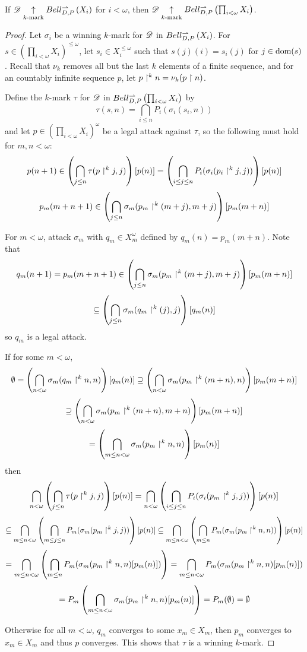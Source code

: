 \begin{thm}
  If $\mathscr{D}\underset{k\text{-mark}}{\uparrow} Bell_{D,P}^{\rightharpoonup}\left({X_i}\right)$ for $i<\omega$, then
  $\mathscr{D}\underset{k\text{-mark}}{\uparrow} Bell_{D,P}^{\rightharpoonup}\left({\prod_{i<\omega}X_i}\right)$.
\end{thm}

\begin{proof}
  Let $\sigma_i$ be a winning $k$-mark for $\mathscr{D}$ in $Bell_{D,P}^{\rightharpoonup}\left({X_i}\right)$.
  For $s\in \left(\prod_{i<\omega}X_i\right)^{\leq \omega}$,
  let $s_i \in X_i^{\leq \omega}$ such that $s(j)(i)=s_i(j)$ for $j\in\textrm{dom}(s)$.
  Recall that $\nu_k$ removes all but the last $k$ elements of a finite
  sequence, and for an countably infinite sequence $p$,
  let $p\restriction^k n=\nu_k(p\restriction n)$.

  Define the $k$-mark $\tau$ for $\mathscr{D}$ in $Bell_{D,P}^{\rightharpoonup}\left({\prod_{i<\omega}X_i}\right)$
  by
    \[
      \tau(s,n)
        =
      \bigcap_{i\leq n}
      P_i(\sigma_i(s_i,n))
    \]
  and let $p\in\left(\prod_{i<\omega}X_i\right)^\omega$ be a legal attack
  against $\tau$, so the following must hold for $m,n<\omega$:
    \[
      p(n+1)
        \in
      \left(\bigcap_{j\leq n}\tau(p\restriction^k j,j)\right)[p(n)]
        =
      \left(\bigcap_{i\leq j\leq n}P_i(\sigma_i(p_i\restriction^k j,j))\right)[p(n)]
    \]
    \[
      p_m(m+n+1)
        \in
      \left(\bigcap_{j\leq n}\sigma_m(p_m\restriction^k(m+j),m+j)\right)[p_m(m+n)]
    \]

  For $m<\omega$, attack $\sigma_m$ with $q_m\in X_m^\omega$ defined by
  $q_m(n)=p_m(m+n)$. Note that
    \[
      q_m(n+1) = p_m(m+n+1)
        \in
      \left(\bigcap_{j\leq n}\sigma_m(p_m\restriction^k(m+j),m+j)\right)[p_m(m+n)]
    \]
    \[
        \subseteq
      \left(\bigcap_{j\leq n}\sigma_m(q_m\restriction^k(j),j)\right)[q_m(n)]
    \]
  so $q_m$ is a legal attack.

  If for some $m<\omega$,
    \[
      \emptyset
        =
      \left(\bigcap_{n<\omega} \sigma_m(q_m\restriction^k n,n)\right)[q_m(n)]
        \supseteq
      \left(\bigcap_{n<\omega} \sigma_m(p_m\restriction^k(m+n),n)\right)[p_m(m+n)]
    \]
    \[
        \supseteq
      \left(\bigcap_{n<\omega} \sigma_m(p_m\restriction^k(m+n),m+n)\right)[p_m(m+n)]
    \]
    \[
        =
      \left(\bigcap_{m\leq n<\omega} \sigma_m(p_m\restriction^k n,n)\right)[p_m(n)]
    \]
  then
    \[
      \bigcap_{n<\omega} \left(
        \bigcap_{j\leq n} \tau(p\restriction^k j,j)
      \right)[p(n)]
        =
      \bigcap_{n<\omega} \left(
        \bigcap_{i\leq j\leq n} P_i(\sigma_i(p_m\restriction^k j,j))
      \right)[p(n)]
    \]
    \[
        \subseteq
      \bigcap_{m\leq n<\omega} \left(
        \bigcap_{m\leq j\leq n} P_m(\sigma_m(p_m\restriction^k j,j))
      \right)[p(n)]
        \subseteq
      \bigcap_{m\leq n<\omega} \left(
        \bigcap_{m\leq n} P_m(\sigma_m(p_m\restriction^k n,n))
      \right)[p(n)]
    \]
    \[
        =
      \bigcap_{m\leq n<\omega} \left(
        \bigcap_{m\leq n} P_m(\sigma_m(p_m\restriction^k n,n)[p_m(n)])
      \right)
        =
      \bigcap_{m\leq n<\omega}
      P_m(\sigma_m(p_m\restriction^k n,n)[p_m(n)])
    \]
    \[
        =
      P_m \left(
        \bigcap_{m\leq n<\omega}\sigma_m(p_m\restriction^k n,n)[p_m(n)]
      \right)
        =
      P_m(\emptyset)
        =
      \emptyset
    \]

  Otherwise for all $m<\omega$, $q_m$ converges to some $x_m\in X_m$,
  then $p_m$ converges to $x_m\in X_m$ and thus $p$ converges. This
  shows that $\tau$ is a winning $k$-mark.
\end{proof}
